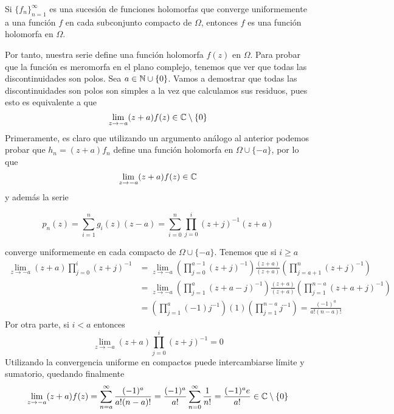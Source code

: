 \documentclass[twoside]{article}
\begin{document}
\begin{ejercicio}{1}
\begin{solucion}
\begin{theorem}
Si $\{f_n\}_{n=1}^\infty$ es una sucesión de funciones holomorfas que converge uniformemente a una función $f$ en cada subconjunto compacto de $\Omega$, entonces $f$ es una función holomorfa en $\Omega$.
\end{theorem}

Por tanto, nuestra serie define una función holomorfa $f(z)$ en $\Omega$. Para probar que la función es meromorfa en el plano complejo, tenemos que ver que todas las discontinuidades son polos. Sea $a\in \mathbb{N}\cup\{0\}$. Vamos a demostrar que todas las discontinuidades son polos son simples a la vez que calculamos sus residuos, pues esto es equivalente a que 
$$
\lim_{z\to -a}(z+a)f(z) \in\mathbb{C}\setminus\{0\}
$$
Primeramente, es claro que utilizando un argumento análogo al anterior podemos probar que $h_n = (z+a)f_n$ define una función holomorfa en $\Omega \cup\{-a\}$, por lo que 
$$
\lim_{z\to -a}(z+a)f(z) \in\mathbb{C}
$$
y además la serie

$$
p_n(z) = \sum_{i=1}^n g_i(z) (z-a) = \sum_{i=0}^n \prod_{j=0}^i (z+j)^{-1}(z+a)
$$

converge uniformemente en cada compacto de $\Omega\cup\{-a\}$.  Tenemos que si $i\geq a$
\begin{align*}
\lim_{z\to -a}(z+a)\prod_{j=0}^i \left(z+j\right)^{-1}& =  \lim_{z\rightarrow-a}\left(\prod_{j=0}^{a-1}(z+j)^{-1}\right)\frac{(z+a)}{(z+a)}\left(\prod_{j=a+1}^{n}(z+j)^{-1}\right)\\
&=\lim_{z\rightarrow-a}\left(\prod_{j=1}^{a}(z+a-j)^{-1}\right)\frac{(z+a)}{(z+a)}\left(\prod_{j=1}^{n-a}(z+a+j)^{-1}\right) \\
&=\left(\prod_{j=1}^{a}(-1)j^{-1}\right)(1)\left(\prod_{j=1}^{n-a}j^{-1}\right)=\frac{(-1)^a}{a!(n-a)!}
\end{align*}
Por otra parte, si $i<a$ entonces
$$
\lim_{z\to -a}(z+a)\prod_{j=0}^i \left(z+j\right)^{-1} = 0
$$
Utilizando la convergencia uniforme en compactos puede intercambiarse límite y sumatorio, quedando finalmente
$$
\lim_{z\to -a}(z+a)f(z) = \sum_{n=a}^\infty \frac{(-1)^a}{a!(n-a)!} = \frac{(-1)^a}{a!}\sum_{n=0}^\infty \frac{1}{n!} = \frac{(-1)^a e}{a!} \in \mathbb{C}\setminus\{0\}
$$
\end{solucion}
\end{ejercicio}
\newpage
\end{document}
